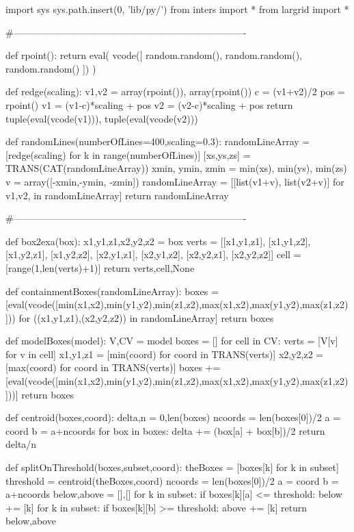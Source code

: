 
import sys
sys.path.insert(0, 'lib/py/')
from inters import *
from largrid import *

#-------------------------------------------------------------------------

def rpoint():
    return eval( vcode([ random.random(), random.random(), random.random() ]) )

def redge(scaling):
    v1,v2 = array(rpoint()), array(rpoint())
    c = (v1+v2)/2
    pos = rpoint()
    v1 = (v1-c)*scaling + pos
    v2 = (v2-c)*scaling + pos
    return tuple(eval(vcode(v1))), tuple(eval(vcode(v2)))

def randomLines(numberOfLines=400,scaling=0.3):
    randomLineArray = [redge(scaling) for k in range(numberOfLines)]
    [xs,ys,zs] = TRANS(CAT(randomLineArray))
    xmin, ymin, zmin = min(xs), min(ys), min(zs)
    v = array([-xmin,-ymin, -zmin])
    randomLineArray = [[list(v1+v), list(v2+v)] for v1,v2, in randomLineArray]
    return randomLineArray

#-------------------------------------------------------------------------

def box2exa(box):
    x1,y1,z1,x2,y2,z2 = box
    verts = [[x1,y1,z1], [x1,y1,z2], [x1,y2,z1], [x1,y2,z2], [x2,y1,z1], [x2,y1,z2], [x2,y2,z1], [x2,y2,z2]]
    cell = [range(1,len(verts)+1)]
    return verts,cell,None

def containmentBoxes(randomLineArray):
    boxes = [eval(vcode([min(x1,x2),min(y1,y2),min(z1,z2),max(x1,x2),max(y1,y2),max(z1,z2)]))
            for ((x1,y1,z1),(x2,y2,z2)) in randomLineArray]
    return boxes

def modelBoxes(model):
	V,CV = model
	boxes = []
	for cell in CV:
		verts = [V[v] for v in cell]
		x1,y1,z1 = [min(coord) for coord in TRANS(verts)]
		x2,y2,z2 = [max(coord) for coord in TRANS(verts)]
		boxes += [eval(vcode([min(x1,x2),min(y1,y2),min(z1,z2),max(x1,x2),max(y1,y2),max(z1,z2)]))]
	return boxes

def centroid(boxes,coord):
    delta,n = 0,len(boxes)
    ncoords = len(boxes[0])/2
    a = coord%
    b = a+ncoords
    for box in boxes:
        delta += (box[a] + box[b])/2
    return delta/n

def splitOnThreshold(boxes,subset,coord):
    theBoxes = [boxes[k] for k in subset]
    threshold = centroid(theBoxes,coord)
    ncoords = len(boxes[0])/2
    a = coord%
    b = a+ncoords
    below,above = [],[]
    for k in subset:
        if boxes[k][a] <= threshold: below += [k]
    for k in subset:
        if boxes[k][b] >= threshold: above += [k]
    return below,above



